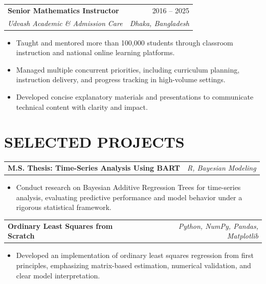 \documentclass[10pt,letterpaper]{article}
\makeatletter
\newcommand{\resumeEntry}[4]{%
	\begin{tabularx}{\textwidth}{@{}Xr@{}}
		\textbf{#1} & #2 \\
		\textit{#3} & \textit{#4}
	\end{tabularx}%
}
\newcommand{\projectEntry}[2]{%
	\begin{tabularx}{\textwidth}{@{}Xr@{}}
		\textbf{#1} & \textit{#2}
	\end{tabularx}%
}
\newenvironment{resumeItems}{%
	\begin{itemize}[
		label=\textbullet,
		leftmargin=14pt,
		labelsep=5pt,
		itemsep=0.5pt,
		topsep=1.0pt,
		parsep=0pt,
		partopsep=0pt
	]
}{%
	\end{itemize}
}
\makeatother
\begin{document}
\vspace{1.3pt}

\resumeEntry
	{Senior Mathematics Instructor}
	{2016 -- 2025}
	{Udvash Academic \& Admission Care}
	{Dhaka, Bangladesh}

\begin{resumeItems}
	\item Taught and mentored more than 100,000 students through classroom instruction and national online learning platforms.

	\item Managed multiple concurrent priorities, including curriculum planning, instruction delivery, and progress tracking in high-volume settings.

	\item Developed concise explanatory materials and presentations to communicate technical content with clarity and impact.
\end{resumeItems}

\section*{SELECTED PROJECTS}

\projectEntry
	{M.S. Thesis: Time-Series Analysis Using BART}
	{R, Bayesian Modeling}

\begin{resumeItems}
	\item Conduct research on Bayesian Additive Regression Trees for time-series analysis, evaluating predictive performance and model behavior under a rigorous statistical framework.
\end{resumeItems}

\vspace{0.7pt}

\projectEntry
	{Ordinary Least Squares from Scratch}
	{Python, NumPy, Pandas, Matplotlib}

\begin{resumeItems}
	\item Developed an implementation of ordinary least squares regression from first principles, emphasizing matrix-based estimation, numerical validation, and clear model interpretation.
\end{resumeItems}

\end{document}
